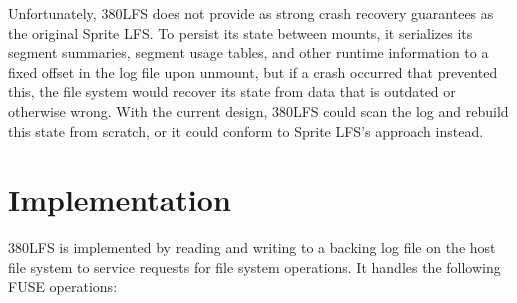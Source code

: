 \documentclass{article}
\begin{document}
Unfortunately, 380LFS does not provide as strong crash recovery guarantees as the original Sprite LFS. To persist its state between mounts, it serializes its segment summaries, segment usage tables, and other runtime information to a fixed offset in the log file upon unmount, but if a crash occurred that prevented this, the file system would recover its state from data that is outdated or otherwise wrong. With the current design, 380LFS could scan the log and rebuild this state from scratch, or it could conform to Sprite LFS’s approach instead.

\section{Implementation}

380LFS is implemented by reading and writing to a backing log file on the host file system to service requests for file system operations. It handles the following FUSE operations:
\end{document}
